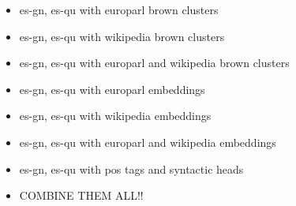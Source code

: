 \begin{itemize}
  \item es-gn, es-qu with europarl brown clusters
  \item es-gn, es-qu with wikipedia brown clusters
  \item es-gn, es-qu with europarl and wikipedia brown clusters
\end{itemize}

\begin{itemize}
  \item es-gn, es-qu with europarl embeddings
  \item es-gn, es-qu with wikipedia embeddings
  \item es-gn, es-qu with europarl and wikipedia embeddings
  \item es-gn, es-qu with pos tags and syntactic heads
\end{itemize}

\begin{itemize}
  \item COMBINE THEM ALL!!
\end{itemize}
